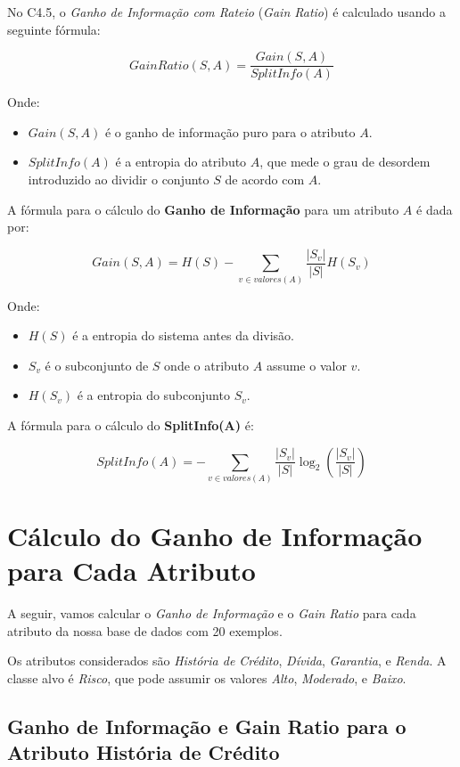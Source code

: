 \documentclass[a4paper,12pt]{article}
\begin{document}
No C4.5, o \textit{Ganho de Informação com Rateio} (\textit{Gain Ratio}) é calculado usando a seguinte fórmula:

\[
GainRatio(S, A) = \frac{Gain(S, A)}{SplitInfo(A)}
\]

Onde:

\begin{itemize}
    \item \(Gain(S, A)\) é o ganho de informação puro para o atributo \(A\).
    \item \(SplitInfo(A)\) é a entropia do atributo \(A\), que mede o grau de desordem introduzido ao dividir o conjunto \(S\) de acordo com \(A\).
\end{itemize}

A fórmula para o cálculo do \textbf{Ganho de Informação} para um atributo \(A\) é dada por:

\[
Gain(S, A) = H(S) - \sum_{v \in valores(A)} \frac{|S_v|}{|S|} H(S_v)
\]

Onde:

\begin{itemize}
    \item \(H(S)\) é a entropia do sistema antes da divisão.
    \item \(S_v\) é o subconjunto de \(S\) onde o atributo \(A\) assume o valor \(v\).
    \item \(H(S_v)\) é a entropia do subconjunto \(S_v\).
\end{itemize}

A fórmula para o cálculo do \textbf{SplitInfo(A)} é:

\[
SplitInfo(A) = -\sum_{v \in valores(A)} \frac{|S_v|}{|S|} \log_2 \left(\frac{|S_v|}{|S|}\right)
\]

\section{Cálculo do Ganho de Informação para Cada Atributo}

A seguir, vamos calcular o \textit{Ganho de Informação} e o \textit{Gain Ratio} para cada atributo da nossa base de dados com 20 exemplos. 

Os atributos considerados são \textit{História de Crédito}, \textit{Dívida}, \textit{Garantia}, e \textit{Renda}. A classe alvo é \textit{Risco}, que pode assumir os valores \textit{Alto}, \textit{Moderado}, e \textit{Baixo}.

\subsection{Ganho de Informação e Gain Ratio para o Atributo História de Crédito}
\end{document}
